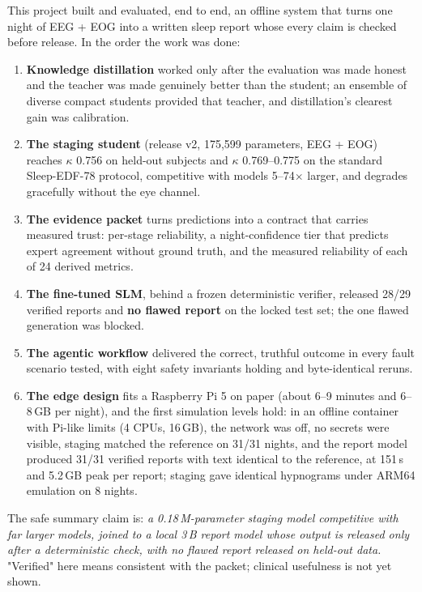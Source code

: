 This project built and evaluated, end to end, an offline system that turns one night of EEG + EOG into a written
sleep report whose every claim is checked before release. In the order the work was done:

\begin{enumerate}
  \item \textbf{Knowledge distillation} worked only after the evaluation was made honest and the teacher was made
  genuinely better than the student; an ensemble of diverse compact students provided that teacher, and
  distillation's clearest gain was calibration.
  \item \textbf{The staging student} (release v2, 175,599 parameters, EEG + EOG) reaches $\kappa$ 0.756 on held-out
  subjects and $\kappa$ 0.769--0.775 on the standard Sleep-EDF-78 protocol, competitive with models 5--74$\times$
  larger, and degrades gracefully without the eye channel.
  \item \textbf{The evidence packet} turns predictions into a contract that carries measured trust: per-stage
  reliability, a night-confidence tier that predicts expert agreement without ground truth, and the measured
  reliability of each of 24 derived metrics.
  \item \textbf{The fine-tuned SLM}, behind a frozen deterministic verifier, released 28/29 verified reports and
  \textbf{no flawed report} on the locked test set; the one flawed generation was blocked.
  \item \textbf{The agentic workflow} delivered the correct, truthful outcome in every fault scenario tested, with
  eight safety invariants holding and byte-identical reruns.
  \item \textbf{The edge design} fits a Raspberry Pi 5 on paper (about 6--9 minutes and 6--8\,GB per night), and the
  first simulation levels hold: in an offline container with Pi-like limits (4 CPUs, 16\,GB), the network was off, no
  secrets were visible, staging matched the reference on 31/31 nights, and the report model produced 31/31 verified
  reports with text identical to the reference, at 151\,s and 5.2\,GB peak per report; staging gave identical hypnograms
  under ARM64 emulation on 8 nights.
\end{enumerate}

The safe summary claim is: \emph{a 0.18\,M-parameter staging model competitive with far larger models, joined to a
local 3\,B report model whose output is released only after a deterministic check, with no flawed report released
on held-out data.} "Verified" here means consistent with the packet; clinical usefulness is not yet shown.

